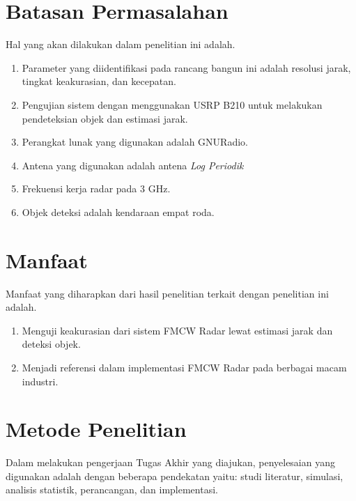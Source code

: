 \section{Batasan Permasalahan}
Hal yang akan dilakukan dalam penelitian ini adalah.
\begin{enumerate}
	\item Parameter yang diidentifikasi pada rancang bangun ini adalah resolusi jarak, tingkat keakurasian, dan kecepatan.
	\item Pengujian sistem dengan menggunakan USRP B210 untuk melakukan pendeteksian objek dan estimasi jarak.
	\item Perangkat lunak yang digunakan adalah GNURadio.
	\item Antena yang digunakan adalah antena \textit{Log Periodik}
	\item Frekuensi kerja radar pada 3 GHz.
	\item Objek deteksi adalah kendaraan empat roda.
\end{enumerate}

\section{Manfaat}
Manfaat yang diharapkan dari hasil penelitian terkait dengan penelitian ini adalah. 
\begin{enumerate}
	\item Menguji keakurasian dari sistem FMCW Radar lewat estimasi jarak dan deteksi objek.
	\item Menjadi referensi dalam implementasi FMCW Radar pada berbagai macam industri.
\end{enumerate}

\section{Metode Penelitian}
Dalam melakukan pengerjaan Tugas Akhir yang diajukan, penyelesaian yang digunakan adalah dengan beberapa pendekatan yaitu: studi literatur, simulasi, analisis statistik, perancangan, dan implementasi.

